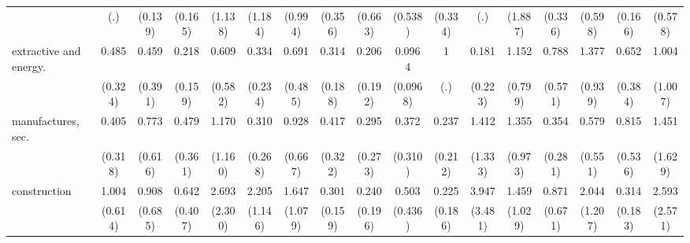 {\begin{tabular}{l*{16}{c}}
                    &         (.)         &     (0.139)         &     (0.165)         &     (1.138)         &     (1.184)         &     (0.994)         &     (0.356)         &     (0.663)         &     (0.538)         &     (0.334)         &         (.)         &     (1.887)         &     (0.336)         &     (0.598)         &     (0.166)         &     (0.578)         \\
[1em]
extractive and energy.&       0.485         &       0.459         &       0.218\sym{*}  &       0.609         &       0.334         &       0.691         &       0.314         &       0.206         &      0.0964\sym{*}  &           1         &       0.181         &       1.152         &       0.788         &       1.377         &       0.652         &       1.004         \\
                    &     (0.324)         &     (0.391)         &     (0.159)         &     (0.582)         &     (0.234)         &     (0.485)         &     (0.188)         &     (0.192)         &    (0.0968)         &         (.)         &     (0.223)         &     (0.799)         &     (0.571)         &     (0.939)         &     (0.384)         &     (1.007)         \\
[1em]
manufactures, sec.  &       0.405         &       0.773         &       0.479         &       1.170         &       0.310         &       0.928         &       0.417         &       0.295         &       0.372         &       0.237         &       1.412         &       1.355         &       0.354         &       0.579         &       0.815         &       1.451         \\
                    &     (0.318)         &     (0.616)         &     (0.361)         &     (1.160)         &     (0.268)         &     (0.667)         &     (0.322)         &     (0.273)         &     (0.310)         &     (0.212)         &     (1.333)         &     (0.973)         &     (0.281)         &     (0.551)         &     (0.536)         &     (1.629)         \\
[1em]
construction        &       1.004         &       0.908         &       0.642         &       2.693         &       2.205         &       1.647         &       0.301\sym{*}  &       0.240         &       0.503         &       0.225         &       3.947         &       1.459         &       0.871         &       2.044         &       0.314\sym{*}  &       2.593         \\
                    &     (0.614)         &     (0.685)         &     (0.407)         &     (2.300)         &     (1.146)         &     (1.079)         &     (0.159)         &     (0.196)         &     (0.436)         &     (0.186)         &     (3.481)         &     (1.029)         &     (0.671)         &     (1.207)         &     (0.183)         &     (2.571)         \\

\end{tabular}}
